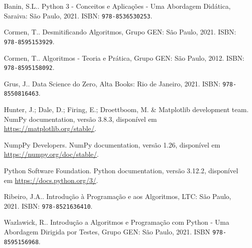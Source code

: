 \documentclass[a4paper,10pt,twoside]{book}
\begin{document}
\begin{thebibliography}{99}
  Banin, S.L.. Python 3 - Conceitos e Aplicações - Uma Abordagem Didática, Saraiva: São Paulo, 2021. ISBN: \texttt{978-8536530253}.

  Cormen, T.. Desmitificando Algoritmos, Grupo GEN: São Paulo, 2021. ISBN: \texttt{978-8595153929}.

  Cormen, T.. Algoritmos - Teoria e Prática, Grupo GEN: São Paulo, 2012. ISBN: \texttt{978-8595158092}.

  Grus, J.. Data Science do Zero, Alta Books: Rio de Janeiro, 2021. ISBN: \texttt{978-8550816463}.

  Hunter, J.; Dale, D.; Firing, E.; Droettboom, M. \& Matplotlib development team. NumPy documentation, versão 3.8.3, disponível em \url{https://matplotlib.org/stable/}.

  NumpPy Developers. NumPy documentation, versão 1.26, disponível em \url{https://numpy.org/doc/stable/}.

  Python Software Foundation. Python documentation, versão 3.12.2, disponível em \url{https://docs.python.org/3/}.

  Ribeiro, J.A.. Introdução à Programação e aos Algoritmos, LTC: São Paulo, 2021. ISBN: \texttt{978-8521636410}.

  Wazlawick, R.. Introdução a Algoritmos e Programação com Python - Uma Abordagem Dirigida por Testes, Grupo GEN: São Paulo, 2021. ISBN \texttt{978-8595156968}.

\end{thebibliography}

\ifisbook
\printindex
\fi
\end{document}

